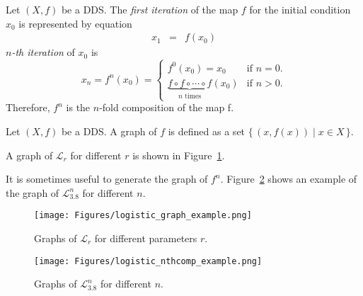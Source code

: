 \begin{definition}
    Let $\left( X, f \right)$ be a DDS. 
    The \emph{first iteration} of the map $f$ for the initial condition $x_0$ is represented by equation
    \begin{eqnarray}
        x_{1}  & = & f(x_{0})
    \end{eqnarray}
    \emph{$n$-th iteration} of $x_0$ is
    \begin{equation}
    x_{n} = f^{n}(x_0) =
        \begin{cases}
            f^{0}(x_0) = x_0 & \text{if } n = 0. \\
            \underbrace{f \circ f \circ \cdots \circ f}_\text{$n$ times}(x_0) & \text{if } n > 0. 
        \end{cases}
    \end{equation}
    Therefore, $f^{n}$ is the $n$-fold composition of the map f.
\end{definition}

\begin{definition}[Graph]
    Let $\left( X, f \right)$ be a DDS. A graph of $f$ is defined as a set $\{\, (x, f(x)) \mid x \in X \,\}$.
\end{definition}

\begin{remark}
    A graph of $\mathcal{L}_{r}$ for different $r$ is shown in Figure~\ref{fig:logistic_graph_example}.
    \par
    It is sometimes useful to generate the graph of $f^{n}$.
    Figure~\ref{fig:logistic_nthcomp_example} shows an example of the graph of $\mathcal{L}_{3.8}^{n}$ for different $n$.
\end{remark}

\begin{figure}[!h]
    \centering
    \texttt{[image: Figures/logistic\_graph\_example.png]}
    \caption{
        Graphs of $\mathcal{L}_{r}$ for different parameters $r$.
    }
    \label{fig:logistic_graph_example}
\end{figure}

\begin{figure}[!h]
    \centering
    \texttt{[image: Figures/logistic\_nthcomp\_example.png]}
    \caption{
        Graphs of $\mathcal{L}_{3.8}^{n}$ for different $n$.
    }
    \label{fig:logistic_nthcomp_example}
\end{figure}

